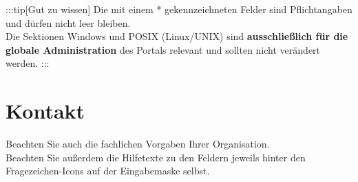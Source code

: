 \documentclass[
  letterpaper,
  DIV=11,
  numbers=noendperiod]{scrreprt}
\begin{document}
:::tip{[}Gut zu wissen{]} Die mit einem * gekennzeichneten Felder sind
Pflichtangaben und dürfen nicht leer bleiben.\\
Die Sektionen Windows und POSIX (Linux/UNIX) sind \textbf{ausschließlich
für die globale Administration} des Portals relevant und sollten nicht
verändert werden. :::

\section{Kontakt}\label{kontakt}

Beachten Sie auch die fachlichen Vorgaben Ihrer Organisation.\\
Beachten Sie außerdem die Hilfetexte zu den Feldern jeweils hinter den
Fragezeichen-Icons auf der Eingabemaske selbst.

\begin{figure}[H]


\end{figure}
\end{document}
